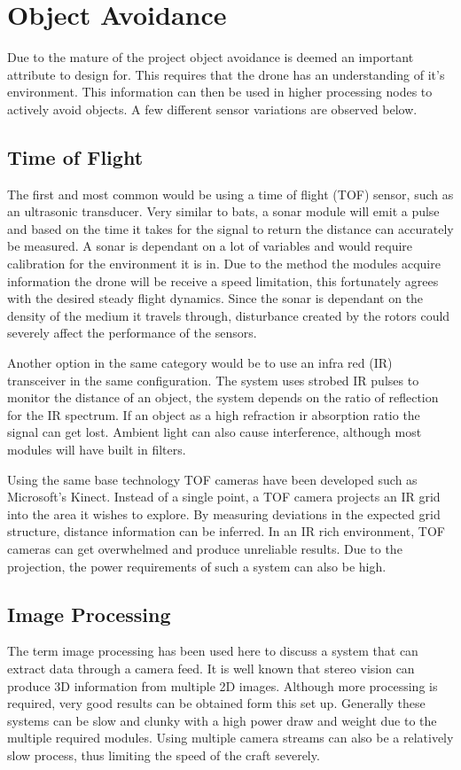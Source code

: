 		\section{Object Avoidance}
		Due to the mature of the project object avoidance is deemed an important attribute to design for. This requires that the drone has an understanding of it's environment. This information can then be used in higher processing nodes to actively avoid objects. A few different sensor variations are observed below. 
	
			\subsection{Time of Flight}		
			The first and most common would be using a time of flight (TOF) sensor, such as an ultrasonic transducer. Very similar to bats, a sonar module will emit a pulse and based on the time it takes for the signal to return the distance can accurately be measured. A sonar is dependant on a lot of variables and would require calibration for the environment it is in. Due to the method the modules acquire information the drone will be receive a speed limitation, this fortunately agrees with the desired steady flight dynamics. Since the sonar is dependant on the density of the medium it travels through, disturbance created by the rotors could severely affect the performance of the sensors.
			
			Another option in the same category would be to use an infra red (IR) transceiver in the same configuration. The system uses strobed IR pulses to monitor the distance of an object, the system depends on the ratio of reflection for the IR spectrum. If an object as a high refraction ir absorption ratio the signal can get lost. Ambient light can also cause interference, although most modules will have built in filters.
			
			Using the same base technology TOF cameras have been developed such as Microsoft's Kinect. Instead of a single point, a TOF camera projects an IR grid into the area it wishes to explore. By measuring deviations in the expected grid structure, distance information can be inferred. In an IR rich environment, TOF cameras can get overwhelmed and produce unreliable results. Due to the projection, the power requirements of such a system can also be high.
			
			\subsection{Image Processing}
			The term image processing has been used here to discuss a system that can extract data through a camera feed. It is well known that stereo vision can produce 3D information from multiple 2D images. Although more processing is required, very good results can be obtained form this set up. Generally these systems can be slow and clunky with a high power draw and weight due to the multiple required modules. Using multiple camera streams can also be a relatively slow process, thus limiting the speed of the craft severely.
		
